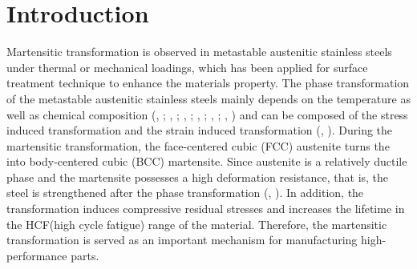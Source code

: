 \documentclass[preprint,5p,twocolumn,10pt,sort&compress]{elsarticle}
\begin{document}
\section{Introduction}
Martensitic transformation is observed in metastable austenitic stainless steels under thermal or mechanical loadings, which has been applied for surface treatment technique to enhance the materials property. The phase transformation of the metastable austenitic stainless steels mainly depends on the temperature as well as chemical composition (\citeauthor{Angel}, \citeyear{Angel}; \citeauthor{Lecroisey1972Martensitic}, \citeyear{Lecroisey1972Martensitic}; \citeauthor{Olson1975Kinetics}, \citeyear{Olson1975Kinetics}; \citeauthor{Hecker1982Effects}, \citeyear{Hecker1982Effects}; \citeauthor{Diani1998Effects}, \citeyear{Diani1998Effects}; \citeauthor{Stringfellow1992A}, \citeyear{Stringfellow1992A})
and can be composed of the stress induced transformation and the strain induced transformation (\citeauthor{Olson1975Kinetics}, \citeyear{Olson1975Kinetics}). During the martensitic transformation, the face-centered cubic (FCC) austenite turns the into body-centered cubic (BCC) martensite. Since austenite is a relatively ductile phase and the martensite possesses a high deformation resistance, that is, the steel is strengthened after the phase transformation (\citeauthor{Santacreu2006Behaviour}, \citeyear{Santacreu2006Behaviour}). In addition, the transformation induces compressive residual stresses and increases the lifetime in the HCF(high cycle fatigue) range of the material. Therefore, the martensitic transformation is served as an important mechanism for manufacturing high-performance parts.

\end{document}
